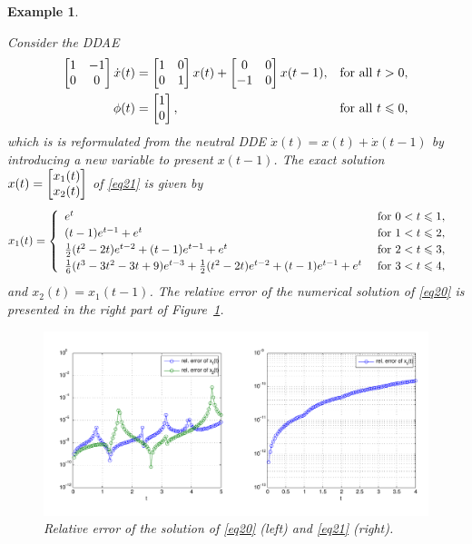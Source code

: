 \documentclass[final,reqno]{siamltex}
\newtheorem{example}[theorem]{Example}
\begin{document}
\begin{example}\label{Exa2} {\rm Consider the DDAE
%
\begin{equation}\label{eq21}
\begin{aligned}
\m{
1&-1\\
0&0
}
\dot{x}(t) &=
\m{
1& 0\\
0&1
}
x(t) +
\m{
0& 0\\
-1&0
}
x(t-1), && \mbox{for all } t>0,\\
\phi(t) &=
\m{
1\\
0
},
&& \mbox{for all } t \leq 0,
\end{aligned}
\end{equation}
%
which is is reformulated from the neutral DDE $\dot{x}(t)=x(t)+\dot{x}(t-1)$ by introducing a new variable to present $x(t-1)$. The exact solution
$x(t)= \begin{bmatrix} x_1(t) \\ x_2(t) \end{bmatrix}$ of \eqref{eq21} is given by
%
\begin{align*}
x_1(t)=
\begin{cases}
\begin{array}{ll}
e^t & \mbox{ for } 0<t\leqslant1, \\
(t-1)e^{t-1}+e^t & \mbox{ for } 1<t\leqslant2, \\
\tfrac12(t^2-2t)e^{t-2}+(t-1)e^{t-1}+e^t & \mbox{ for } 2<t\leqslant3,\\
\tfrac16(t^3-3t^2-3t+9)e^{t-3}+\tfrac12 (t^2-2t)e^{t-2}+(t-1)e^{t-1}+e^t & \mbox{ for } 3<t\leqslant4,
\end{array}
\end{cases}
\end{align*}
%
and
$x_2(t)=x_1(t-1)$. The relative error of the numerical solution of \eqref{eq20} is presented in the right part of Figure~\ref{fig_Paul}.
%
\begin{figure}[h]
 \centering
 \includegraphics[width=\textwidth]{plot_149_214.pdf}
 \caption{Relative error of the solution of \eqref{eq20} (left) and \eqref{eq21} (right).}
 \label{fig_Paul}
\end{figure}
}
\end{example}
\end{document}
